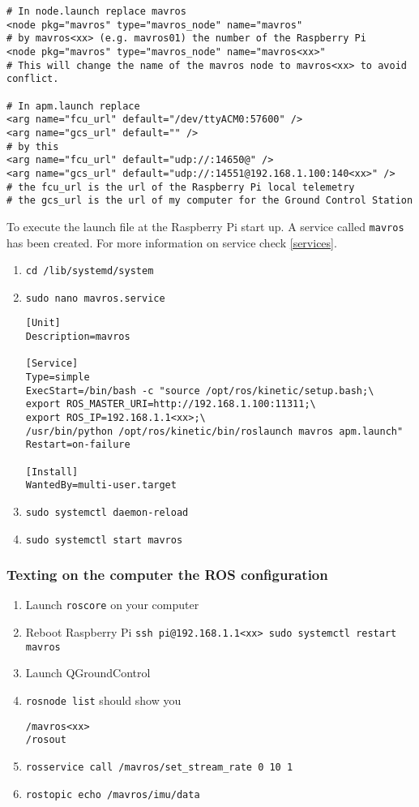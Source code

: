 \begin{verbatim}
# In node.launch replace mavros
<node pkg="mavros" type="mavros_node" name="mavros"
# by mavros<xx> (e.g. mavros01) the number of the Raspberry Pi
<node pkg="mavros" type="mavros_node" name="mavros<xx>"
# This will change the name of the mavros node to mavros<xx> to avoid conflict.

# In apm.launch replace
<arg name="fcu_url" default="/dev/ttyACM0:57600" />
<arg name="gcs_url" default="" />
# by this
<arg name="fcu_url" default="udp://:14650@" />
<arg name="gcs_url" default="udp://:14551@192.168.1.100:140<xx>" />
# the fcu_url is the url of the Raspberry Pi local telemetry
# the gcs_url is the url of my computer for the Ground Control Station
                \end{verbatim}

To execute the launch file at the Raspberry Pi start up. A service called \texttt{mavros} has been created.
For more information on service check \ref{services}.

\begin{enumerate}
    \item \texttt{cd /lib/systemd/system}
    \item \texttt{sudo nano mavros.service}
          \begin{verbatim}
[Unit]
Description=mavros

[Service]
Type=simple
ExecStart=/bin/bash -c "source /opt/ros/kinetic/setup.bash;\
export ROS_MASTER_URI=http://192.168.1.100:11311;\
export ROS_IP=192.168.1.1<xx>;\
/usr/bin/python /opt/ros/kinetic/bin/roslaunch mavros apm.launch"
Restart=on-failure

[Install]
WantedBy=multi-user.target
                    \end{verbatim}
    \item \texttt{sudo systemctl daemon-reload}
    \item \texttt{sudo systemctl start mavros}
\end{enumerate}

\subsubsection{Texting on the computer the ROS configuration}
\begin{enumerate}
    \item Launch \texttt{roscore} on your computer
    \item Reboot Raspberry Pi \texttt{ssh pi@192.168.1.1<xx> sudo systemctl restart mavros}
    \item Launch QGroundControl
    \item \texttt{rosnode list} should show you

          \begin{verbatim}
/mavros<xx>
/rosout
                    \end{verbatim}
    \item \texttt{rosservice call /mavros/set\_stream\_rate 0 10 1}
    \item \texttt{rostopic echo /mavros/imu/data}
\end{enumerate}

